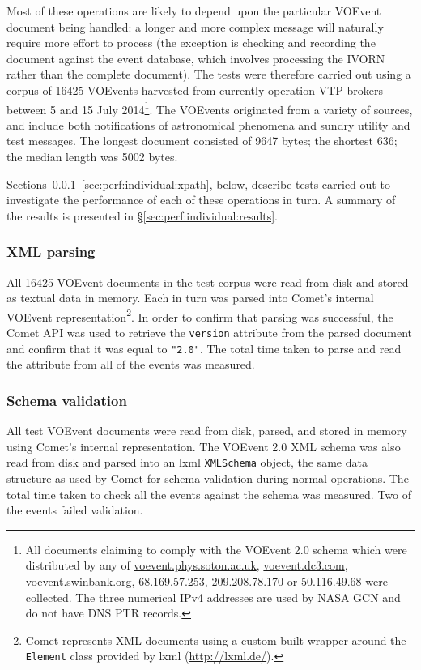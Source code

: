 \documentclass[5p,authoryear]{elsarticle}
\begin{document}
Most of these operations are likely to depend upon the particular VOEvent
document being handled: a longer and more complex message will naturally
require more effort to process (the exception is checking and recording the
document against the event database, which involves processing the IVORN
rather than the complete document). The tests were therefore carried out
using a corpus of 16425 VOEvents harvested from currently operation VTP
brokers between 5 and 15 July 2014\footnote{All documents claiming to comply
with the VOEvent 2.0 schema which were distributed by any of
\url{voevent.phys.soton.ac.uk}, \url{voevent.dc3.com},
\url{voevent.swinbank.org}, \url{68.169.57.253}, \url{209.208.78.170} or
\url{50.116.49.68} were collected. The three numerical IPv4 addresses are used
by NASA GCN and do not have DNS PTR records.}. The VOEvents originated from a
variety of sources, and include both notifications of astronomical phenomena
and sundry utility and test messages. The longest document consisted of 9647
bytes; the shortest 636; the median length was 5002 bytes.

Sections~\ref{sec:perf:individual:parse}--\ref{sec:perf:individual:xpath},
below, describe tests carried out to investigate the performance of each of
these operations in turn. A summary of the results is presented in
\S\ref{sec:perf:individual:results}.

\subsubsection{XML parsing}
\label{sec:perf:individual:parse}

All 16425 VOEvent documents in the test corpus were read from disk and stored
as textual data in memory. Each in turn was parsed into Comet's internal
VOEvent representation\footnote{Comet represents XML documents using a
custom-built wrapper around the \texttt{Element} class provided by lxml
(\url{http://lxml.de/}).}. In order to confirm that parsing was successful,
the Comet API was used to retrieve the \texttt{version} attribute from the
parsed document and confirm that it was equal to \texttt{"2.0"}. The total
time taken to parse and read the attribute from all of the events was
measured.

\subsubsection{Schema validation}

All test VOEvent documents were read from disk, parsed, and stored in memory
using Comet's internal representation. The VOEvent 2.0 XML schema was also
read from disk and parsed into an lxml \texttt{XMLSchema} object, the same
data structure as used by Comet for schema validation during normal
operations. The total time taken to check all the events against the schema
was measured. Two of the events failed validation.
\end{document}
